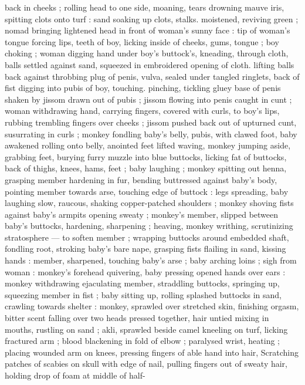back in cheeks ; rolling head to one side, moaning, tears drowning 
mauve iris, spitting clots onto turf : sand soaking up clots, stalks. 
moistened, reviving green ; nomad bringing lightened head in front 
of woman's sunny face : tip of woman's tongue forcing lips, teeth of 
boy, licking inside of cheeks, gums, tongue ; boy choking ; woman 
digging hand under boy's buttock's, kneading, through cloth, balls 
settled against sand, squeezed in embroidered opening of cloth. 
lifting balls back against throbbing plug of penis, vulva, sealed under 
tangled ringlets, back of fist digging into pubis of boy, touching. 
pinching, tickling gluey base of penis shaken by jissom drawn out of 
pubis ; jissom flowing into penis caught in cunt ; woman withdrawing 
hand, carrying fingers, covered with curls, to boy's lips, rubbing 
trembling fingers over cheeks ; jissom pushed back out of upturned 
cunt, susurrating in curls ; monkey fondling baby's belly, pubis, with 
clawed foot, baby awakened rolling onto belly, anointed feet lifted 
waving, monkey jumping aside, grabbing feet, burying furry muzzle 
into blue buttocks, licking fat of buttocks, back of thighs, knees, 
hams, feet ; baby laughing ; monkey spitting out henna, grasping 
member hardening in fur, bending buttressed against baby's body, 
pointing member towards arse, touching edge of buttock : legs 
spreading, baby laughing slow, raucous, shaking copper-patched 
shoulders ; monkey shoving fists against baby's armpits opening 
sweaty ; monkey's member, slipped between baby's buttocks, 
hardening, sharpening ; heaving, monkey writhing, scrutinizing 
stratosphere --- to soften member ; wrapping buttocks around 
embedded shaft, fondling root, stroking baby's bare nape, grasping 
fists flailing in sand, kissing hands : member, sharpened, touching 
baby's arse ; baby arching loins ; sigh from woman : monkey's 
forehead quivering, baby pressing opened hands over ears : monkey 
withdrawing ejaculating member, straddling buttocks, springing up, 
squeezing member in fist ; baby sitting up, rolling splashed buttocks 
in sand, crawling towards shelter : monkey, sprawled over stretched 
skin, finishing orgasm, bitter scent falling over two heads pressed 
together, hair untied mixing in mouths, rustling on sand ; akli, 
sprawled beside camel kneeling on turf, licking fractured arm ; blood 
blackening in fold of elbow ; paralysed wrist, heating ; placing 
wounded arm on knees, pressing fingers of able hand into hair, 
Scratching patches of scabies on skull with edge of nail, pulling 
fingers out of sweaty hair, holding drop of foam at middle of half- 
